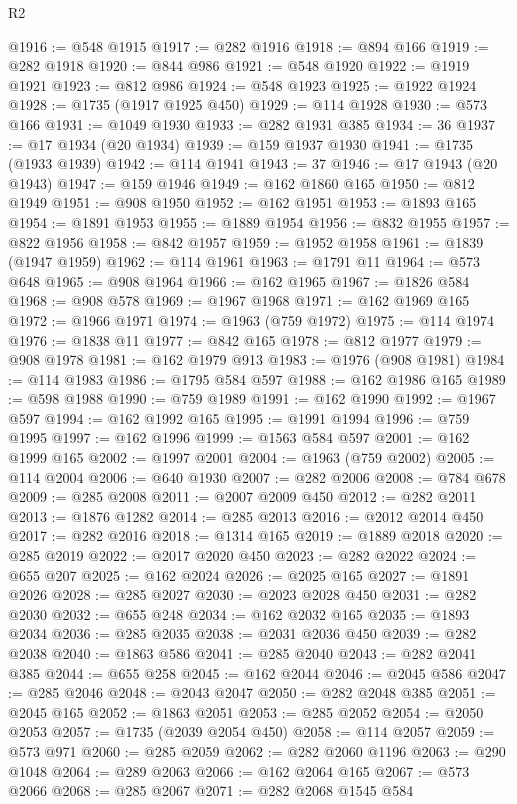 \begin{lexlean}{R2}
\begin{coremodule}
@1916 := @548 @1915
@1917 := @282 @1916
@1918 := @894 @166
@1919 := @282 @1918
@1920 := @844 @986
@1921 := @548 @1920
@1922 := @1919 @1921
@1923 := @812 @986
@1924 := @548 @1923
@1925 := @1922 @1924
@1928 := @1735 (@1917 @1925 @450)
@1929 := @114 @1928
@1930 := @573 @166
@1931 := @1049 @1930
@1933 := @282 @1931 @385
@1934 := 36
@1937 := @17 @1934 (@20 @1934)
@1939 := @159 @1937 @1930
@1941 := @1735 (@1933 @1939)
@1942 := @114 @1941
@1943 := 37
@1946 := @17 @1943 (@20 @1943)
@1947 := @159 @1946
@1949 := @162 @1860 @165
@1950 := @812 @1949
@1951 := @908 @1950
@1952 := @162 @1951
@1953 := @1893 @165
@1954 := @1891 @1953
@1955 := @1889 @1954
@1956 := @832 @1955
@1957 := @822 @1956
@1958 := @842 @1957
@1959 := @1952 @1958
@1961 := @1839 (@1947 @1959)
@1962 := @114 @1961
@1963 := @1791 @11
@1964 := @573 @648
@1965 := @908 @1964
@1966 := @162 @1965
@1967 := @1826 @584
@1968 := @908 @578
@1969 := @1967 @1968
@1971 := @162 @1969 @165
@1972 := @1966 @1971
@1974 := @1963 (@759 @1972)
@1975 := @114 @1974
@1976 := @1838 @11
@1977 := @842 @165
@1978 := @812 @1977
@1979 := @908 @1978
@1981 := @162 @1979 @913
@1983 := @1976 (@908 @1981)
@1984 := @114 @1983
@1986 := @1795 @584 @597
@1988 := @162 @1986 @165
@1989 := @598 @1988
@1990 := @759 @1989
@1991 := @162 @1990
@1992 := @1967 @597
@1994 := @162 @1992 @165
@1995 := @1991 @1994
@1996 := @759 @1995
@1997 := @162 @1996
@1999 := @1563 @584 @597
@2001 := @162 @1999 @165
@2002 := @1997 @2001
@2004 := @1963 (@759 @2002)
@2005 := @114 @2004
@2006 := @640 @1930
@2007 := @282 @2006
@2008 := @784 @678
@2009 := @285 @2008
@2011 := @2007 @2009 @450
@2012 := @282 @2011
@2013 := @1876 @1282
@2014 := @285 @2013
@2016 := @2012 @2014 @450
@2017 := @282 @2016
@2018 := @1314 @165
@2019 := @1889 @2018
@2020 := @285 @2019
@2022 := @2017 @2020 @450
@2023 := @282 @2022
@2024 := @655 @207
@2025 := @162 @2024
@2026 := @2025 @165
@2027 := @1891 @2026
@2028 := @285 @2027
@2030 := @2023 @2028 @450
@2031 := @282 @2030
@2032 := @655 @248
@2034 := @162 @2032 @165
@2035 := @1893 @2034
@2036 := @285 @2035
@2038 := @2031 @2036 @450
@2039 := @282 @2038
@2040 := @1863 @586
@2041 := @285 @2040
@2043 := @282 @2041 @385
@2044 := @655 @258
@2045 := @162 @2044
@2046 := @2045 @586
@2047 := @285 @2046
@2048 := @2043 @2047
@2050 := @282 @2048 @385
@2051 := @2045 @165
@2052 := @1863 @2051
@2053 := @285 @2052
@2054 := @2050 @2053
@2057 := @1735 (@2039 @2054 @450)
@2058 := @114 @2057
@2059 := @573 @971
@2060 := @285 @2059
@2062 := @282 @2060 @1196
@2063 := @290 @1048
@2064 := @289 @2063
@2066 := @162 @2064 @165
@2067 := @573 @2066
@2068 := @285 @2067
@2071 := @282 @2068 @1545 @584

\end{coremodule}
\end{lexlean}
